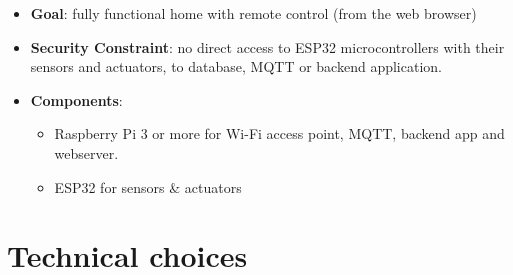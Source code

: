 \documentclass{report}
\begin{document}
\begin{itemize}
\item \textbf{Goal}: fully functional home with remote control (from the web browser)
\item \textbf{Security Constraint}: no direct access to ESP32 microcontrollers with their sensors and actuators, to database, MQTT or backend application.
\item \textbf{Components}:
    \begin{itemize}
        \item Raspberry Pi 3 or more for Wi-Fi access point, MQTT, backend app and webserver.
        \item ESP32 for sensors \& actuators
    \end{itemize}
\end{itemize}

\section{Technical choices}\label{sec:technical-choices}
\end{document}
